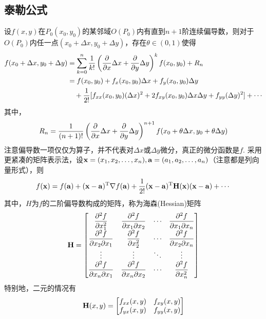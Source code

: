 \subsection{泰勒公式}
\begin{theorem}[Taylor]
设$f(x,y)$在$P_0(x_0,y_0)$的某邻域$O(P_0)$内有直到$n+1$阶连续偏导数，则对于$O(P_0)$内任一点$(x_0+\Delta x,y_0+\Delta y)$，存在$\theta\in(0,1)$使得
\[\begin{aligned}
f(x_0+\Delta x,y_0+\Delta y)&=\sum_{k=0}^n\frac{1}{k!}\left(\dfrac{\partial }{\partial x}\Delta x+\dfrac{\partial }{\partial y}\Delta y\right)^kf(x_0,y_0)+R_n\\
&=f(x_0,y_0)+f_x(x_0,y_0)\Delta x+f_y(x_0,y_0)\Delta y\\
&\quad+\frac{1}{2!}[f_{xx}(x_0,y_0)(\Delta x)^2+2f_{xy}(x_0,y_0)\Delta x\Delta y+f_{yy}(\Delta y)^2]+\cdots
\end{aligned}\]
其中，
\[R_n=\frac{1}{(n+1)!}\left(\dfrac{\partial }{\partial x}\Delta x+\dfrac{\partial }{\partial y}\Delta y\right)^{n+1}f(x_0+\theta\Delta x,y_0+\theta\Delta y)\]
注意偏导数一项仅仅为算子，并不代表对$\Delta x$或$\Delta y$微分，真正的微分函数是$f$.
采用更紧凑的矩阵表示法，设$\mathbf{x}=(x_1,x_2,\ldots,x_n),\mathbf{a}=(a_1,a_2,\ldots,a_n)$（注意都是列向量形式），则
\[f(\mathbf{x})=f(\mathbf{a})+(\mathbf{x}-\mathbf{a})^{\mathrm{T}}\nabla f(\mathbf{a})+\frac{1}{2!}(\mathbf{x}-\mathbf{a})^{\mathrm{T}} \mathbf{H}(\mathbf{x})(\mathbf{x}-\mathbf{a})+\cdots\]
其中，$H$为$f$的二阶偏导数构成的矩阵，称为海森(Hessian)矩阵
\[\mathbf{H}=\begin{bmatrix}\dfrac{\partial^2 f}{\partial x_1^2} & \dfrac{\partial^2 f}{\partial x_1\partial x_2} &\cdots &\dfrac{\partial^2 f}{\partial x_1\partial x_n}\\
\dfrac{\partial^2 f}{\partial x_2\partial x_1}&\dfrac{\partial^2 f}{\partial x_2^2}&\cdots&\dfrac{\partial^2 f}{\partial x_2\partial x_n}\\
\vdots&\vdots&\ddots&\vdots\\
\dfrac{\partial^2 f}{\partial x_n\partial x_1}&\dfrac{\partial^2 f}{\partial x_n\partial x_2}&\cdots&\dfrac{\partial^2 f}{\partial x_n^2}\end{bmatrix}\]
特别地，二元的情况有
\[\mathbf{H}(x,y)=\begin{bmatrix}f_{xx}(x,y) & f_{xy}(x,y)\\f_{yx}(x,y) & f_{yy}(x,y)\end{bmatrix}\]
\end{theorem}

